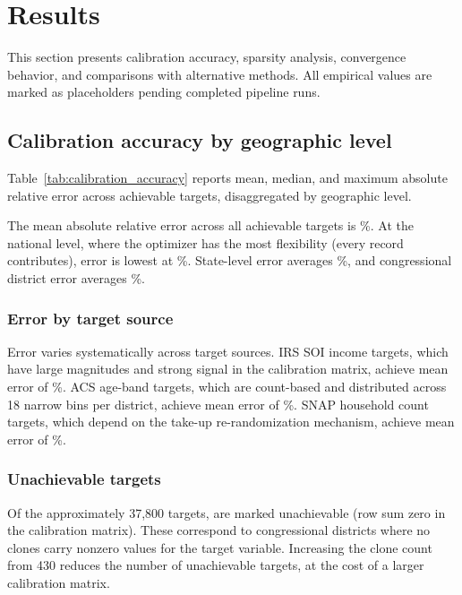 \section{Results}
\label{sec:results}

This section presents calibration accuracy, sparsity analysis, convergence behavior, and comparisons with alternative methods. All empirical values are marked as placeholders pending completed pipeline runs.

\subsection{Calibration accuracy by geographic level}

Table~\ref{tab:calibration_accuracy} reports mean, median, and maximum absolute relative error across achievable targets, disaggregated by geographic level.



The mean absolute relative error across all  achievable targets is \%. At the national level, where the optimizer has the most flexibility (every record contributes), error is lowest at \%. State-level error averages \%, and congressional district error averages \%.

\subsubsection{Error by target source}

Error varies systematically across target sources. IRS SOI income targets, which have large magnitudes and strong signal in the calibration matrix, achieve mean error of \%. ACS age-band targets, which are count-based and distributed across 18 narrow bins per district, achieve mean error of \%. SNAP household count targets, which depend on the take-up re-randomization mechanism, achieve mean error of \%.

\subsubsection{Unachievable targets}

Of the approximately 37,800 targets, \tbc[count] are marked unachievable (row sum zero in the calibration matrix). These correspond to congressional districts where no clones carry nonzero values for the target variable. Increasing the clone count from 430 reduces the number of unachievable targets, at the cost of a larger calibration matrix.

